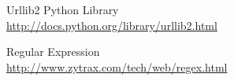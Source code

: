 \begin{thebibliography}{99}
Urllib2 Python Library\\ \url{http://docs.python.org/library/urllib2.html}

Regular Expression\\ \url{http://www.zytrax.com/tech/web/regex.html}









\end{thebibliography}